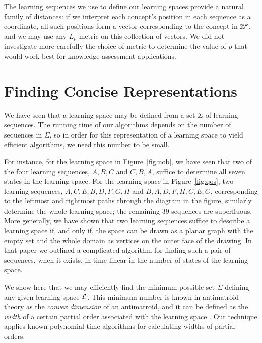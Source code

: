 \documentclass[11pt]{llncs}
\def\Zee{\ensuremath{\Bbb Z}}
\begin{document}
{The learning sequences we use to define our learning spaces provide a natural family of distances:
if we interpret each concept's position in each sequence as a coordinate, all such positions form a vector corresponding to the concept in $\Zee^k$, and we may use any $L_p$ metric on this collection of vectors. We did not investigate more carefully the choice of metric to determine the value of $p$ that would work best for knowledge assessment applications.

\section{Finding Concise Representations}

We have seen that a learning space may be defined from a set $\Sigma$ of learning sequences.
The running time of our algorithms depends on the number of sequences in $\Sigma$, so in order for this representation of a learning space to yield efficient algorithms, we need this number to be small.

For instance, for the learning space in Figure~\ref{fig:nob}, we have seen that two of the four learning sequences, $A,B,C$ and $C,B,A$, suffice to determine all seven states in the learning space.
For the learning space in Figure~\ref{fig:qos}, two learning sequences, 
$A,C,E,B,D,F,G,H$ and $B,A,D,F,H,C,E,G$, corresponding to the leftmost and rightmost paths through the diagram in the figure, similarly determine the whole learning space; the remaining 39 sequences are superfluous. More generally, we have shown \citep{eppst06} that two learning sequences suffice to describe a learning space if, and only if, the space can be drawn as a planar graph with the empty set and the whole domain as vertices on the outer face of the drawing. In that paper we outlined a complicated algorithm for finding such a pair of sequences, when it exists, in time linear in the number of states of the learning space.

We show here that we may efficiently find the minimum possible set $\Sigma$ defining any given learning space $\cal L$. This minimum number is known in antimatroid theory as the \emph{convex dimension} of an antimatroid, and it can be defined as the \emph{width} of a certain partial order associated with the learning space \citep{KorLovSch-91}.  Our technique applies known polynomial time algorithms for calculating widths of partial orders.

}
\end{document}
